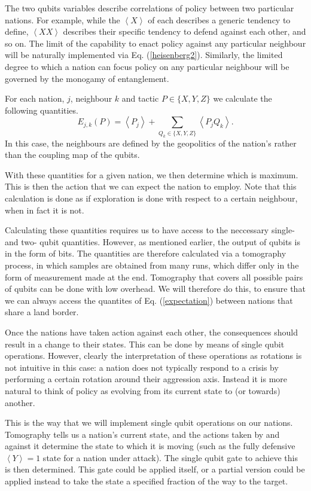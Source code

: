 \documentclass[conference]{IEEEtran}
\begin{document}
The two qubits variables describe correlations of policy between two particular nations. For example, while the $\left\langle X\right\rangle$ of each describes a generic tendency to define, $\left\langle XX\right\rangle$ describes their specific tendency to defend against each other, and so on. The limit of the capability to enact policy against any particular neighbour will be naturally implemented via  Eq. (\ref{heisenberg2}). Similarly, the limited degree to which a nation can focus policy on any particular neighbour will be governed by the monogamy of entanglement.

For each nation, $j$, neighbour $k$ and tactic $P  \in \{X,Y,Z\}$ we calculate the following quantities.
\begin{equation} \label{expectation}
E_{j,k} (P) = \left\langle P_j \right\rangle + \sum_{Q_k \in \{X,Y,Z\} } \left\langle P_j Q_k\right\rangle.
\end{equation}
In this case, the neighbours are defined by the geopolitics of the nation's rather than the coupling map of the qubits.

With these quantities for a given nation, we then determine which is maximum. This is then the action that we can expect the nation to employ. Note that this calculation is done as if exploration is done with respect to a certain neighbour, when in fact it is not.

Calculating these quantities requires us to have access to the neccessary single- and two- qubit quantities. However, as mentioned earlier, the output of qubits is in the form of bits. The quantities are therefore calculated via a tomography process, in which samples are obtained from many runs, which differ only in the form of measurement made at the end. Tomography that covers all possible pairs of qubits can be done with low overhead. We will therefore do this, to ensure that we can always access the quantites of Eq. (\ref{expectation}) between nations that share a land border.

Once the nations have taken action against each other, the consequences should result in a change to their states. This can be done by means of single qubit operations. However, clearly the interpretation of these operations as rotations is not intuitive in this case: a nation does not typically respond to a crisis by performing a certain rotation around their aggression axis. Instead it is more natural to think of policy as evolving from its current state to (or towards) another.

This is the way that we will implement single qubit operations on our nations. Tomography tells us a nation's current state, and the actions taken by and against it determine the state to which it is moving (such as the fully defensive $\left\langle Y\right\rangle=1$ state for a nation under attack). The single qubit gate to achieve this is then determined. This gate could be applied itself, or a partial version could be applied instead to take the state a specified fraction of the way to the target.
\end{document}
